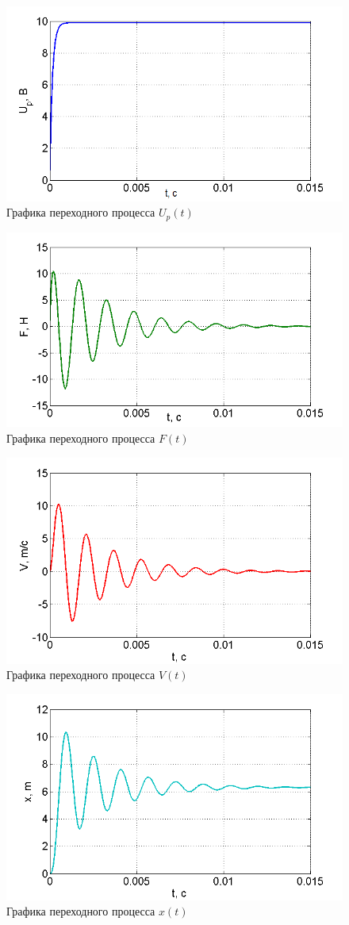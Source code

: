 \documentclass[a4paper, 12pt]{article}
\begin{document}
\newpage
	\begin{figure}[h]
		\centering
		\includegraphics[width=0.7\linewidth]{1}
		\caption{Графика переходного процесса $U_p(t)$}
		\label{fig:1}
	\end{figure}
	\begin{figure}[h]
		\centering
		\includegraphics[width=0.7\linewidth]{2}
		\caption{Графика переходного процесса $F(t)$}
		\label{fig:2}
	\end{figure}
	\begin{figure}[h]
		\centering
		\includegraphics[width=0.7\linewidth]{3}
		\caption{Графика переходного процесса $V(t)$}
		\label{fig:3}
	\end{figure}
	\begin{figure}[h]
		\centering
		\includegraphics[width=0.7\linewidth]{4}
		\caption{Графика переходного процесса $x(t)$}
		\label{fig:4}
	\end{figure}
\end{document}
